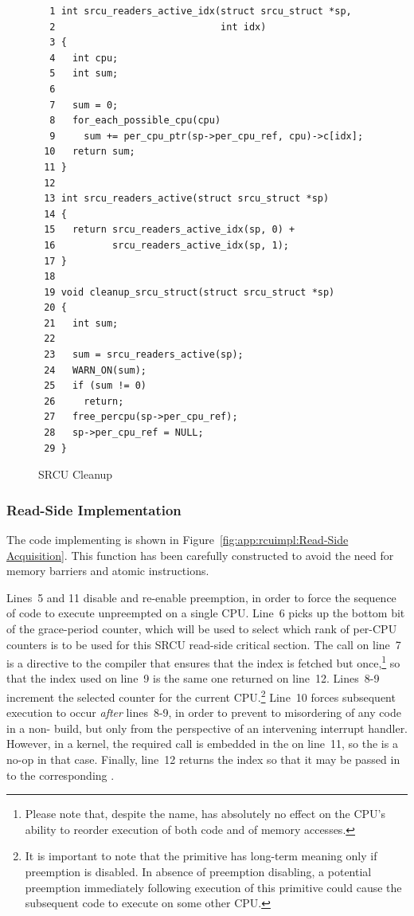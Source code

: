 \begin{figure}[htbp]
{ \scriptsize
\begin{verbatim}
  1 int srcu_readers_active_idx(struct srcu_struct *sp,
  2                             int idx)
  3 {
  4   int cpu;
  5   int sum;
  6
  7   sum = 0;
  8   for_each_possible_cpu(cpu)
  9     sum += per_cpu_ptr(sp->per_cpu_ref, cpu)->c[idx];
 10   return sum;
 11 }
 12
 13 int srcu_readers_active(struct srcu_struct *sp)
 14 {
 15   return srcu_readers_active_idx(sp, 0) +
 16          srcu_readers_active_idx(sp, 1);
 17 }
 18
 19 void cleanup_srcu_struct(struct srcu_struct *sp)
 20 {
 21   int sum;
 22
 23   sum = srcu_readers_active(sp);
 24   WARN_ON(sum);
 25   if (sum != 0)
 26     return;
 27   free_percpu(sp->per_cpu_ref);
 28   sp->per_cpu_ref = NULL;
 29 }
\end{verbatim}
}
\caption{SRCU Cleanup}
\label{fig:app:rcuimpl:SRCU Cleanup}
\end{figure}

\subsubsection{Read-Side Implementation}
\label{sec:app:rcuimpl:Read-Side Implementation}

The code implementing  is shown in
Figure~\ref{fig:app:rcuimpl:Read-Side Acquisition}.
This function has been carefully constructed to avoid the
need for memory barriers and atomic instructions.

Lines~5 and 11 disable and re-enable preemption, in order to force
the sequence of code to execute unpreempted on a single CPU.
Line~6 picks up the bottom bit of the grace-period counter, which will
be used to select which rank of per-CPU counters is to be used for this
SRCU read-side critical section.
The  call on line~7 is a directive to the compiler
that ensures that the index is
fetched but once,\footnote{
	Please note that, despite the name, 
	has absolutely no effect on the CPU's ability to
	reorder execution of both code and of memory accesses.}
so that the index used on line~9 is the same
one returned on line~12.
Lines~8-9 increment the selected counter for the current CPU.\footnote{
	It is important to note that the  primitive
	has long-term meaning only if preemption is disabled.
	In absence of preemption disabling, a potential preemption
	immediately following execution of this primitive could
	cause the subsequent code to execute on some other CPU.}
Line~10 forces subsequent execution to occur \emph{after}
lines~8-9, in order to prevent to misordering of any code
in a non- build, but only
from the perspective of an intervening interrupt handler.
However, in a  kernel, the required 
call is embedded in the  on line~11, so the
 is a no-op in that case.
Finally, line~12 returns the index so that it may be passed in to the
corresponding .

